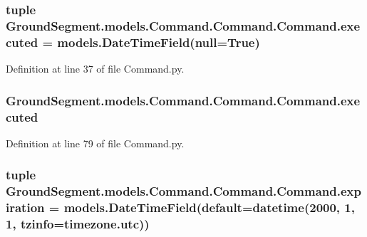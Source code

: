 \subsubsection[{executed}]{\setlength{\rightskip}{0pt plus 5cm}tuple Ground\+Segment.\+models.\+Command.\+Command.\+Command.\+executed = models.\+Date\+Time\+Field(null=True)\hspace{0.3cm}{\ttfamily [static]}}\label{class_ground_segment_1_1models_1_1_command_1_1_command_1_1_command_a3d9c3610dd59bacdabd59da33679db82}


Definition at line 37 of file Command.\+py.

\hypertarget{class_ground_segment_1_1models_1_1_command_1_1_command_1_1_command_a239dc5ac77fcf562791b8edd234a074d}{}
\subsubsection[{executed}]{\setlength{\rightskip}{0pt plus 5cm}Ground\+Segment.\+models.\+Command.\+Command.\+Command.\+executed}\label{class_ground_segment_1_1models_1_1_command_1_1_command_1_1_command_a239dc5ac77fcf562791b8edd234a074d}


Definition at line 79 of file Command.\+py.

\hypertarget{class_ground_segment_1_1models_1_1_command_1_1_command_1_1_command_a3595e7065386bcd506de63f7a96e7111}{}
\subsubsection[{expiration}]{\setlength{\rightskip}{0pt plus 5cm}tuple Ground\+Segment.\+models.\+Command.\+Command.\+Command.\+expiration = models.\+Date\+Time\+Field(default=datetime(2000, 1, 1, tzinfo=timezone.\+utc))\hspace{0.3cm}{\ttfamily [static]}}\label{class_ground_segment_1_1models_1_1_command_1_1_command_1_1_command_a3595e7065386bcd506de63f7a96e7111}


